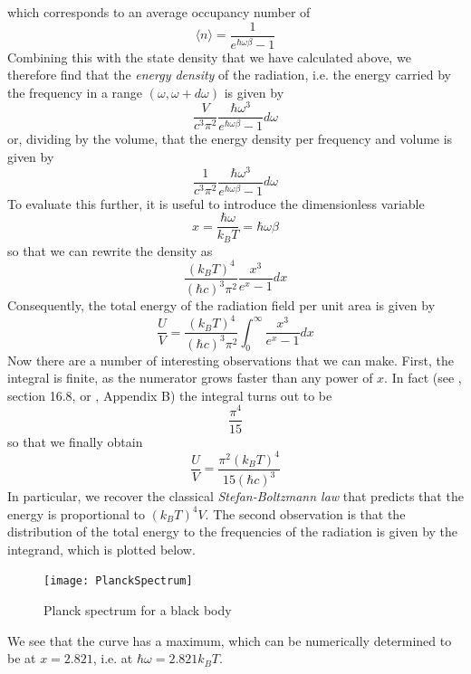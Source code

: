 \documentclass[a4paper, draft]{report}
\numberwithin{section}{chapter}
\numberwithin{equation}{chapter}
\theoremstyle{own}
\theoremstyle{remark}
\begin{document}
which corresponds to an average occupancy number of
$$
\langle n \rangle = \frac{1}{e^{\hbar \omega \beta} - 1}
$$
Combining this with the state density that we have calculated above, we therefore find that the {\em energy density} of the radiation, i.e. the energy carried by the frequency in a range $(\omega, \omega + d\omega)$ is given by
$$
\frac{V}{c^3 \pi^2 }  \frac{\hbar \omega^3}{e^{\hbar \omega \beta} - 1}  d\omega
$$
or, dividing by the volume, that the energy density per frequency and volume is given by
$$
\frac{1}{c^3 \pi^2 }  \frac{\hbar \omega^3}{e^{\hbar \omega \beta} - 1}  d\omega
$$
To evaluate this further, it is useful to introduce the dimensionless variable
$$
x = \frac{\hbar \omega}{k_B T} = \hbar \omega \beta 
$$
so that we can rewrite the density as
$$
\frac{(k_B T)^4}{(\hbar c)^3 \pi^2} \frac{x^3}{e^x - 1} dx
$$
Consequently, the total energy of the radiation field per unit area is given by
$$
\frac{U}{V} = \frac{(k_B T)^4}{(\hbar c)^3 \pi^2} \int_0^\infty \frac{x^3}{e^x - 1} dx
$$
Now there are a number of interesting observations that we can make. First, the integral is finite, as the numerator grows faster than any power of $x$. In fact (see \cite{Callen}, section 16.8, or \cite{Schroeder}, Appendix B) the integral turns out to be 
$$
\frac{\pi^4}{15}
$$
so that we finally obtain
$$
\frac{U}{V} = \frac{\pi^2 (k_B T)^4}{15 (\hbar c)^3}
$$
In particular, we recover the classical {\em Stefan-Boltzmann law} that predicts that the energy is proportional to $(k_B T)^4 V$. The second observation is that the distribution of the total energy to the frequencies of the radiation is given by the integrand, which is plotted below.

\begin{figure}[ht]
\centering
\texttt{[image: PlanckSpectrum]}
\caption{Planck spectrum for a black body}
\label{fig:PlankSpectrum}
\end{figure}

We see that the curve has a maximum, which can be numerically determined to be at $x = 2.821$, i.e. at $\hbar \omega = 2.821 k_B T$. 
\end{document}
